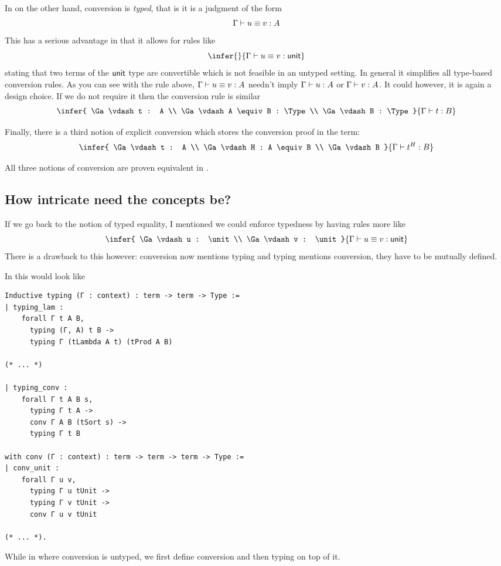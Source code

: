 In \Agda on the other hand, conversion is \emph{typed}, that is it is a judgment
of the form
\[
  \Gamma \vdash u \equiv v : A
\]
This has a serious advantage in that it allows for rules like
\[
  \infer
    { }
    {\Ga \vdash u \equiv v : \unit}
\]
stating that two terms of the \(\mathsf{unit}\) type are convertible which is not
feasible in an untyped setting. In general it simplifies all type-based
conversion rules. As you can see with the rule above,
\(\Gamma \vdash u \equiv v : A\) needn't imply \(\Gamma \vdash u : A\) or
\(\Gamma \vdash v : A\). It could however, it is again a design choice.
If we do not require it then the conversion rule is similar
\[
  \infer
    {
      \Ga \vdash t : A \\
      \Ga \vdash A \equiv B : \Type \\
      \Ga \vdash B : \Type
    }
    {\Ga \vdash t : B}
\]

Finally, there is a third notion of explicit conversion which stores the
conversion proof in the term:
\[
  \infer
    {
      \Ga \vdash t : A \\
      \Ga \vdash H : A \equiv B \\
      \Ga \vdash B
    }
    {\Ga \vdash t^H : B}
\]

All three notions of conversion are proven equivalent in
.

\subsection{How intricate need the concepts be?}

If we go back to the notion of typed equality, I mentioned we could enforce
typedness by having rules more like
\[
  \infer
    {
      \Ga \vdash u : \unit \\
      \Ga \vdash v : \unit
    }
    {\Ga \vdash u \equiv v : \unit}
\]
There is a drawback to this however: conversion now mentions typing and typing
mentions conversion, they have to be mutually defined.

In \Coq this would look like
\begin{verbatim}
Inductive typing (Γ : context) : term -> term -> Type :=
| typing_lam :
    forall Γ t A B,
      typing (Γ, A) t B ->
      typing Γ (tLambda A t) (tProd A B)

(* ... *)

| typing_conv :
    forall Γ t A B s,
      typing Γ t A ->
      conv Γ A B (tSort s) ->
      typing Γ t B

with conv (Γ : context) : term -> term -> term -> Type :=
| conv_unit :
    forall Γ u v,
      typing Γ u tUnit ->
      typing Γ v tUnit ->
      conv Γ u v tUnit

(* ... *).
\end{verbatim}
While in \MetaCoq where conversion is untyped, we first define conversion
and then typing on top of it.

